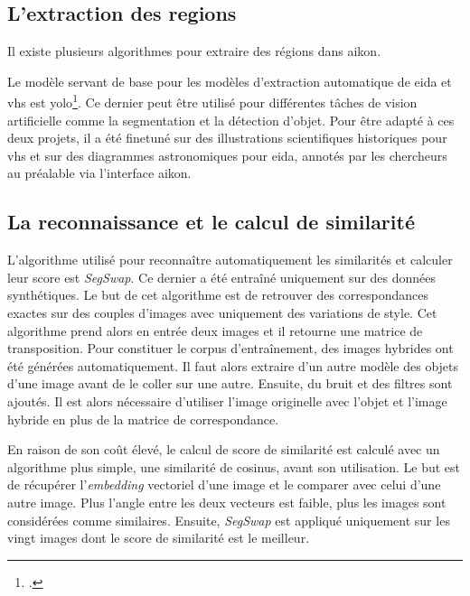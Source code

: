 \subsection{L'extraction des regions}

Il existe plusieurs algorithmes pour extraire des régions dans \gls{aikon}.

Le modèle servant de base pour les modèles d'extraction automatique de \gls{eida} et \gls{vhs} est \gls{yolo}\footcite{jocherYOLOv5Ultralytics2020}. Ce dernier peut être utilisé pour différentes tâches de vision artificielle comme la segmentation et la détection d'objet. Pour être adapté à ces deux projets, il a été finetuné sur des illustrations scientifiques historiques pour \gls{vhs} et sur des diagrammes astronomiques pour \gls{eida}, annotés par les chercheurs au préalable via l'interface \gls{aikon}. 


\subsection{La reconnaissance et le calcul de similarité}

L'algorithme utilisé pour reconnaître automatiquement les similarités et calculer leur score est \textit{SegSwap}. Ce dernier a été entraîné uniquement sur des données synthétiques. Le but de cet algorithme est de retrouver des correspondances exactes sur des couples d'images avec uniquement des variations de style.
Cet algorithme prend alors en entrée deux images et il retourne une matrice de transposition. Pour constituer le corpus d'entraînement, des images hybrides ont été générées automatiquement. Il faut alors extraire d'un autre modèle des objets d'une image avant de le coller sur une autre. Ensuite, du bruit et des filtres sont ajoutés. Il est alors nécessaire d'utiliser l'image originelle avec l'objet et l'image hybride en plus de la matrice de correspondance. 

En raison de son coût élevé, le calcul de score de similarité est calculé avec un algorithme plus simple, une similarité de cosinus, avant son utilisation. Le but est de récupérer l'\textit{embedding} vectoriel d'une image et le comparer avec celui d'une autre image. Plus l'angle entre les deux vecteurs est faible, plus les images sont considérées comme similaires. Ensuite, \textit{SegSwap} est appliqué uniquement sur les vingt images dont le score de similarité est le meilleur.


